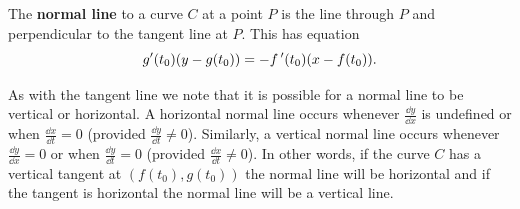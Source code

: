 \begin{definition}\label{def:normal_par}%
The \textbf{normal line} to a curve $C$ at a point $P$ is the line through $P$ and perpendicular to the tangent line at $P$. This has equation
\[g'(t_0)(y-g(t_0))=-f\,'(t_0)(x-f(t_0)).\]
\end{definition}

As with the tangent line we note that it is possible for a normal line to be vertical or horizontal. A horizontal normal line occurs whenever $\frac{\dd y}{\dd x}$ is undefined or when $\frac{\dd x}{\dd t} = 0$ (provided $\frac{\dd y}{\dd t} \neq 0$). Similarly, a vertical normal line occurs whenever $\frac{\dd y}{\dd x} = 0$ or when $\frac{\dd y}{\dd t} = 0$ (provided $\frac{\dd x}{\dd t} \neq 0$). In other words, if the curve $C$ has a vertical tangent  at $(f(t_0), g(t_0))$ the normal line will be horizontal and if the tangent is horizontal the normal line will be a vertical line.


